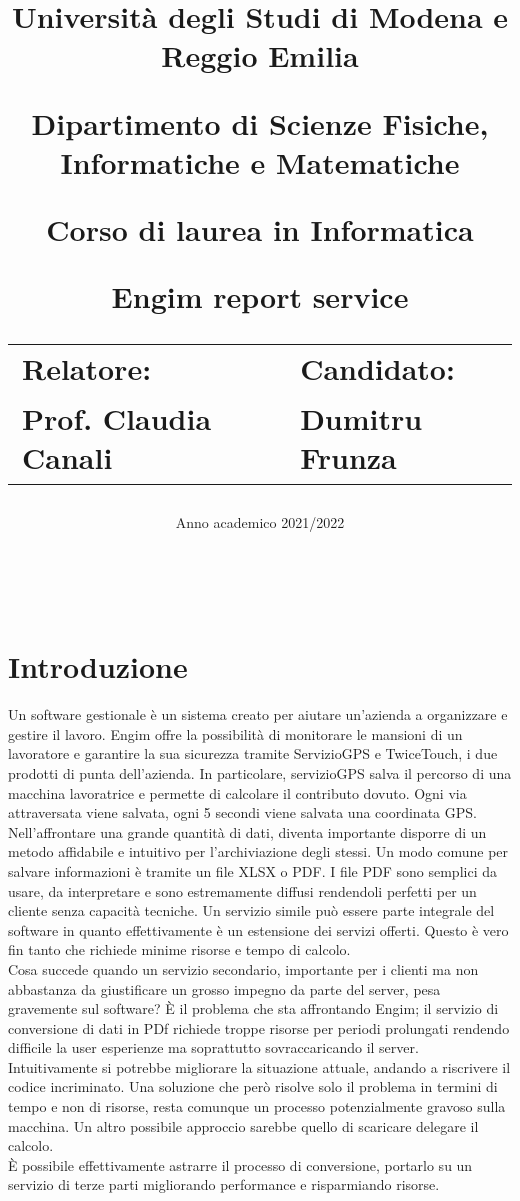 \documentclass[12pt]{article}
\author{}
\title{
    \huge 
        \textbf{Università degli Studi di Modena e Reggio Emilia}
    \large
        \par Dipartimento di Scienze Fisiche, Informatiche e Matematiche
        \par Corso di laurea in Informatica
    \vfil
        \huge \par \textbf{Engim report service}
    \vfil
    \normalsize
    \begin{tabular}{lp{0.4\textwidth}l}
      Relatore: & & Candidato: \\
      Prof. Claudia Canali & &  Dumitru Frunza \\
      \end{tabular}
}
\date{Anno academico 2021/2022}
\begin{document}
\maketitle
\thispagestyle{empty}
\newpage 
\thispagestyle{empty}
\
\newpage
{}
\addtocounter{page}{0}
\listoffigures
\newpage
{}
\tableofcontents
{}
\newpage
{}
\addtocounter{page}{0}


\section*{Introduzione}
Un software gestionale è un sistema creato per aiutare un'azienda a organizzare 
e gestire il lavoro.
Engim offre la possibilità di monitorare le mansioni di un lavoratore e garantire 
la sua sicurezza tramite ServizioGPS e TwiceTouch, i due prodotti di punta dell'azienda. 
In particolare, servizioGPS salva il percorso di una macchina lavoratrice e 
permette di calcolare il contributo dovuto. Ogni via attraversata viene salvata, 
ogni 5 secondi viene salvata una coordinata GPS.
\\ Nell'affrontare una grande quantità di dati, diventa importante
 disporre di un metodo affidabile e intuitivo per l'archiviazione degli stessi.
Un modo comune per salvare informazioni è tramite un file XLSX o PDF.
I file PDF sono semplici da usare, da interpretare e sono estremamente diffusi 
rendendoli perfetti per un cliente senza capacità tecniche. 
Un servizio simile può essere parte integrale del software in quanto effettivamente 
è un estensione dei servizi offerti. 
Questo è vero fin tanto che richiede minime risorse e tempo di calcolo.
\\ Cosa succede quando un servizio secondario, importante per i clienti ma non 
abbastanza da giustificare un grosso impegno da parte del server, pesa gravemente 
sul software? 
È il problema che sta affrontando Engim; il servizio di conversione di dati 
in PDf richiede troppe risorse per periodi prolungati rendendo difficile la user 
esperienze ma soprattutto sovraccaricando il server.
Intuitivamente si potrebbe migliorare la situazione attuale, andando a riscrivere 
il codice incriminato.
Una soluzione che però risolve solo il problema in termini di tempo e non di 
risorse, resta comunque un processo potenzialmente gravoso sulla macchina. 
Un altro possibile approccio sarebbe quello di scaricare delegare il calcolo.
\\ È possibile effettivamente astrarre il processo di conversione, portarlo su 
un servizio di terze parti migliorando performance e risparmiando risorse.
\end{document}
